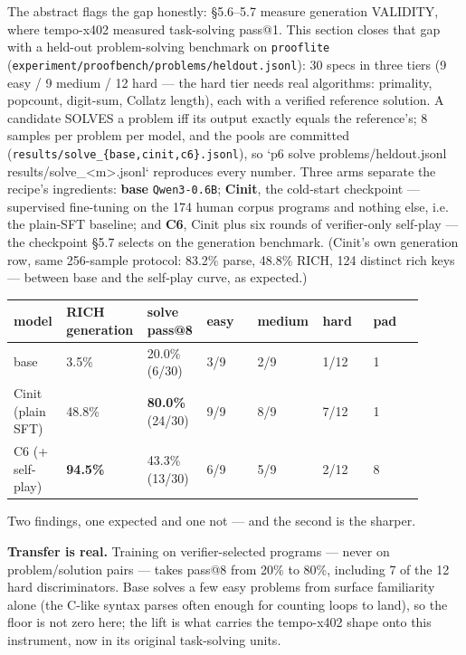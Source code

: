 \documentclass[11pt]{article}
\newcommand{\code}[1]{\texttt{#1}}
\begin{document}
The abstract flags the gap honestly: \S{}5.6--5.7 measure generation VALIDITY,
where tempo-x402 measured task-solving pass@1. This section closes that gap
with a held-out problem-solving benchmark on \code{prooflite}
(\code{experiment/proofbench/problems/heldout.jsonl}): 30 specs in three tiers
(9 easy / 9 medium / 12 hard --- the hard tier needs real algorithms: primality,
popcount, digit-sum, Collatz length), each with a verified reference solution.
A candidate SOLVES a problem iff its output exactly equals the reference's;
8 samples per problem per model, and the pools are committed
(\code{results/solve\_\{base,cinit,c6\}.jsonl}), so `p6 solve problems/heldout.jsonl
results/solve\_<m>.jsonl` reproduces every number. Three arms separate the
recipe's ingredients: \textbf{base} \code{Qwen3-0.6B}; \textbf{Cinit}, the cold-start
checkpoint --- supervised fine-tuning on the 174 human corpus programs and
nothing else, i.e. the plain-SFT baseline; and \textbf{C6}, Cinit plus six rounds of
verifier-only self-play --- the checkpoint \S{}5.7 selects on the generation
benchmark. (Cinit's own generation row, same 256-sample protocol: 83.2\% parse,
48.8\% RICH, 124 distinct rich keys --- between base and the self-play curve, as
expected.)

\begingroup\small
\begin{longtable}{p{0.129\linewidth} p{0.129\linewidth} p{0.129\linewidth} p{0.129\linewidth} p{0.129\linewidth} p{0.129\linewidth} p{0.129\linewidth}}
\toprule
\textbf{model} & \textbf{RICH generation} & \textbf{solve pass@8} & \textbf{easy} & \textbf{medium} & \textbf{hard} & \textbf{pad} \\
\midrule\endhead
base & 3.5\% & 20.0\% (6/30) & 3/9 & 2/9 & 1/12 & 1 \\
Cinit (plain SFT) & 48.8\% & \textbf{80.0\%} (24/30) & 9/9 & 8/9 & 7/12 & 1 \\
C6 (+ self-play) & \textbf{94.5\%} & 43.3\% (13/30) & 6/9 & 5/9 & 2/12 & 8 \\
\bottomrule
\end{longtable}\endgroup

Two findings, one expected and one not --- and the second is the sharper.

\textbf{Transfer is real.} Training on verifier-selected programs --- never on
problem/solution pairs --- takes pass@8 from 20\% to 80\%, including 7 of the 12
hard discriminators. Base solves a few easy problems from surface familiarity
alone (the C-like syntax parses often enough for counting loops to land), so
the floor is not zero here; the lift is what carries the tempo-x402 shape onto
this instrument, now in its original task-solving units.
\end{document}
